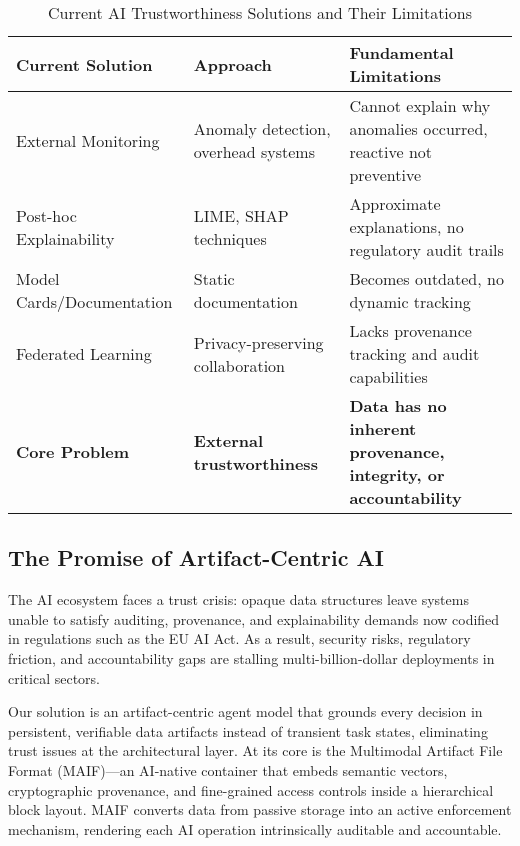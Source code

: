 \documentclass[conference]{IEEEtran}
\begin{document}
\begin{table*}[!t]
\renewcommand{\arraystretch}{1.3}
\caption{Current AI Trustworthiness Solutions and Their Limitations}
\label{tab:current-solutions-limitations}
\centering
\footnotesize
\begin{tabular}{p{3.5cm}p{5cm}p{5.5cm}}
\toprule
\textbf{Current Solution} & \textbf{Approach} & \textbf{Fundamental Limitations} \\
\midrule
External Monitoring & Anomaly detection, overhead systems & Cannot explain why anomalies occurred, reactive not preventive \\
Post-hoc Explainability & LIME, SHAP techniques & Approximate explanations, no regulatory audit trails \\
Model Cards/Documentation & Static documentation & Becomes outdated, no dynamic tracking \\
Federated Learning & Privacy-preserving collaboration & Lacks provenance tracking and audit capabilities \\
\textbf{Core Problem} & \textbf{External trustworthiness} & \textbf{Data has no inherent provenance, integrity, or accountability} \\
\bottomrule
\end{tabular}
\end{table*}

\subsection{The Promise of Artifact-Centric AI}

The AI ecosystem faces a trust crisis: opaque data structures leave systems unable to satisfy auditing, provenance, and explainability demands now codified in regulations such as the EU AI Act. As a result, security risks, regulatory friction, and accountability gaps are stalling multi-billion-dollar deployments in critical sectors.

Our solution is an artifact-centric agent model that grounds every decision in persistent, verifiable data artifacts instead of transient task states, eliminating trust issues at the architectural layer. At its core is the Multimodal Artifact File Format (MAIF)—an AI-native container that embeds semantic vectors, cryptographic provenance, and fine-grained access controls inside a hierarchical block layout. MAIF converts data from passive storage into an active enforcement mechanism, rendering each AI operation intrinsically auditable and accountable.
\end{document}
